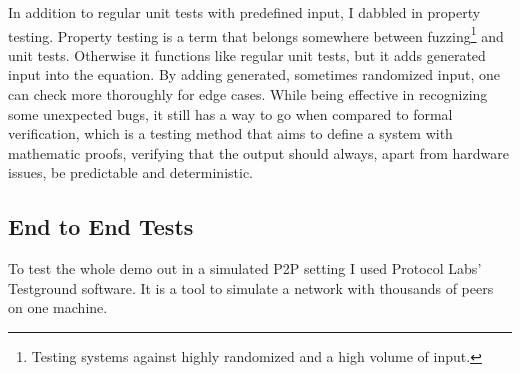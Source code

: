 In addition to regular unit tests with predefined input, I dabbled in property testing. Property testing is a term that belongs somewhere between fuzzing\footnote{Testing systems against highly randomized and a high volume of input.} and unit tests. Otherwise it functions like regular unit tests, but it adds generated input into the equation. By adding generated, sometimes randomized input, one can check more thoroughly for edge cases. While being effective in recognizing some unexpected bugs, it still has a way to go when compared to formal verification, which is a testing method that aims to define a system with mathematic proofs, verifying that the output should always, apart from hardware issues, be predictable and deterministic.

\subsection{End to End Tests}
To test the whole demo out in a simulated P2P setting I used Protocol Labs' Testground software. It is a tool to simulate a network with thousands of peers on one machine.
